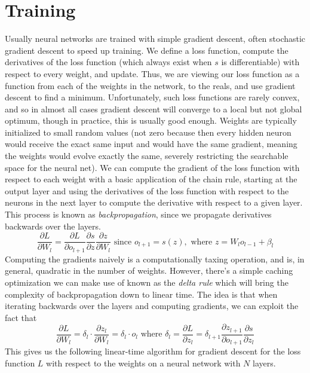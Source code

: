 \documentclass{article}
\begin{document}
\section{Training}
Usually neural networks are trained with simple gradient descent, often stochastic gradient descent to speed up training. We define a loss function, compute the derivatives of the loss function (which always exist when $ s $ is differentiable) with respect to every weight, and update. Thus, we are viewing our loss function as a function from each of the weights in the network, to the reals, and use gradient descent to find a minimum. Unfortunately, such loss functions are rarely convex, and so in almost all cases gradient descent will converge to a local but not global optimum, though in practice, this is usually good enough.
\newline
Weights are typically initialized to small random values (not zero because then every hidden neuron would receive the exact same input and would have the same gradient, meaning the weights would evolve exactly the same, severely restricting the searchable space for the neural net). We can compute the gradient of the loss function with respect to each weight with a basic application of the chain rule, starting at the output layer and using the derivatives of the loss function with respect to the neurons in the next layer to compute the derivative with respect to a given layer. This process is known as \textit{backpropagation}, since we propagate derivatives backwards over the layers.
$$ \frac{\partial L}{\partial W_l} = \frac{\partial L}{\partial o_{l + 1}} \frac{\partial s}{\partial z} \frac{\partial z}{\partial W_l} \text{ since } o_{l + 1} = s(z), \text{ where } z = W_l o_{l - 1} + \beta_l $$
Computing the gradients naively is a computationally taxing operation, and is, in general, quadratic in the number of weights. However, there's a simple caching optimization we can make use of known as the \textit{delta rule} which will bring the complexity of backpropagation down to linear time. The idea is that when iterating backwards over the layers and computing gradients, we can exploit the fact that
$$ \frac{\partial L}{\partial W_l} = \delta_l \cdot \frac{\partial z_l}{\partial W_l} = \delta_l \cdot o_l \text{ where } \delta_l = \frac{\partial L}{\partial z_l} = \delta_{l + 1} \frac{\partial z_{l + 1}}{\partial o_{l + 1}} \frac{\partial s}{\partial z_l} $$
This gives us the following linear-time algorithm for gradient descent for the loss function $ L $ with respect to the weights on a neural network with $ N $ layers.
\end{document}

